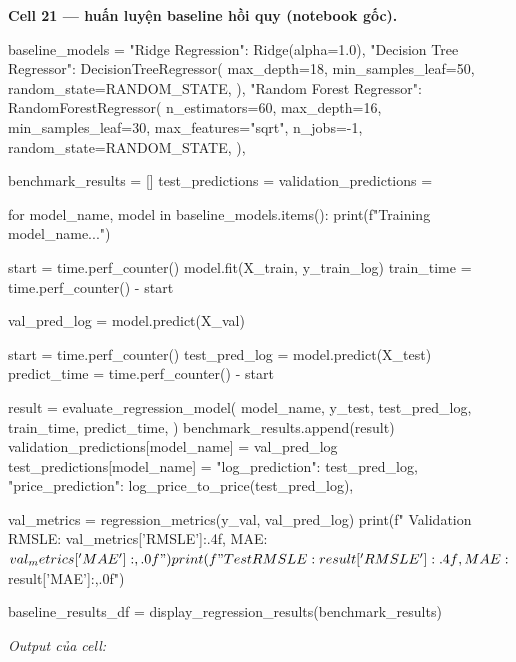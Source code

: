 \documentclass[12pt,a4paper]{report}
\begin{document}
\par\medskip\noindent\textbf{Cell 21 --- huấn luyện baseline hồi quy (notebook gốc).}
\begin{NotebookCode}
baseline_models = {
    "Ridge Regression": Ridge(alpha=1.0),
    "Decision Tree Regressor": DecisionTreeRegressor(
        max_depth=18,
        min_samples_leaf=50,
        random_state=RANDOM_STATE,
    ),
    "Random Forest Regressor": RandomForestRegressor(
        n_estimators=60,
        max_depth=16,
        min_samples_leaf=30,
        max_features="sqrt",
        n_jobs=-1,
        random_state=RANDOM_STATE,
    ),
}

benchmark_results = []
test_predictions = {}
validation_predictions = {}

for model_name, model in baseline_models.items():
    print(f"Training {model_name}...")

    start = time.perf_counter()
    model.fit(X_train, y_train_log)
    train_time = time.perf_counter() - start

    val_pred_log = model.predict(X_val)

    start = time.perf_counter()
    test_pred_log = model.predict(X_test)
    predict_time = time.perf_counter() - start

    result = evaluate_regression_model(
        model_name,
        y_test,
        test_pred_log,
        train_time,
        predict_time,
    )
    benchmark_results.append(result)
    validation_predictions[model_name] = val_pred_log
    test_predictions[model_name] = {
        "log_prediction": test_pred_log,
        "price_prediction": log_price_to_price(test_pred_log),
    }

    val_metrics = regression_metrics(y_val, val_pred_log)
    print(f"  Validation RMSLE: {val_metrics['RMSLE']:.4f}, MAE: ${val_metrics['MAE']:,.0f}")
    print(f"  Test RMSLE: {result['RMSLE']:.4f}, MAE: ${result['MAE']:,.0f}")

baseline_results_df = display_regression_results(benchmark_results)
\end{NotebookCode}
\noindent\textit{Output của cell:}
\end{document}
